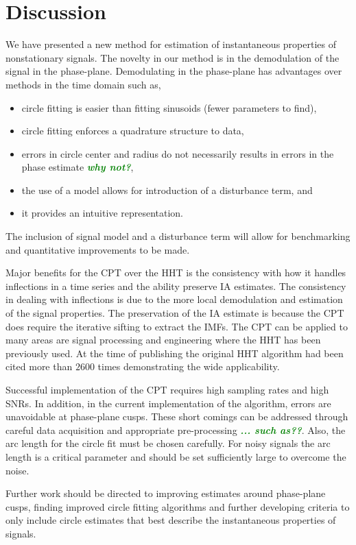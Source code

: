 \documentclass[a4paper]{IEEEtran}
\newcommand{\dean}[1]{\textsf{\emph{\textbf{\textcolor{green}{#1}}}}}
\begin{document}
\section{Discussion}\label{sect:DiscussionSection}
We have presented a new method for estimation of instantaneous properties of nonstationary signals. The novelty in our method is in the demodulation of the signal in the phase-plane. Demodulating in the phase-plane has advantages over methods in the time domain such as, 
\begin{itemize}
    \item circle fitting is easier than fitting sinusoids (fewer parameters to find),
    \item circle fitting enforces a quadrature structure to data,
    \item errors in circle center and radius do not necessarily results in errors in the phase estimate \dean{why not?},
    \item the use of a model  allows for introduction of a disturbance term, and
    \item it provides an intuitive representation.
\end{itemize}
The inclusion of signal model and a disturbance term will allow for benchmarking and quantitative improvements to be made.

Major benefits for the CPT over the HHT is the consistency with how it handles inflections in a time series and the ability preserve IA estimates. The consistency in dealing with inflections is due to the more local demodulation and estimation of the signal properties. The preservation of the IA estimate is because the CPT does require the iterative sifting to extract the IMFs. The CPT can be applied to many areas are signal processing and engineering where the HHT has been previously used. At the time of publishing the original HHT algorithm had been cited more than $2600$ times demonstrating the wide applicability.

Successful implementation of the CPT requires high sampling rates and high SNRs. In addition, in the current implementation of the algorithm, errors are unavoidable at phase-plane cusps. These short comings can be addressed through careful data acquisition and appropriate pre-processing \dean{... such as??}. Also, the arc length for the circle fit must be chosen carefully. For noisy signals the arc length is a critical parameter and should be set sufficiently large to overcome the noise. 

Further work should be directed to improving estimates around phase-plane cusps, finding improved circle fitting algorithms and further developing criteria to only include circle estimates that best describe the instantaneous properties of signals.
\end{document}
